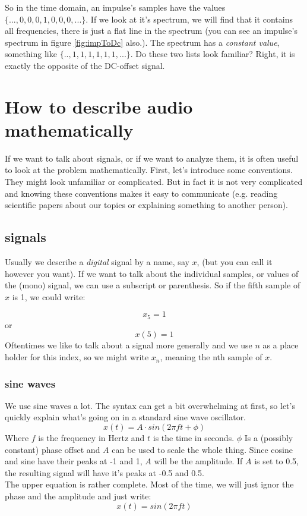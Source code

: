 So in the time domain, an impulse's samples have the values $\{...,0,0,0,1,0,0,0,...\}$. If we look at it's spectrum, we will find that it contains all frequencies, there is just a flat line in the spectrum (you can see an impulse's spectrum in figure \ref{fig:impToDc} also.). The spectrum has a \textit{constant value}, something like $\{..,1,1,1,1,1,1,...\}$. Do these two lists look familiar? Right, it is exactly the opposite of the DC-offset signal.



\section{How to describe audio mathematically}

If we want to talk about signals, or if we want to analyze them, it is often useful to look at the problem mathematically. First, let's introduce some conventions. They might look unfamiliar or complicated. But in fact it is not very complicated and knowing these conventions makes it easy to communicate (e.g. reading scientific papers about our topics or explaining something to another person).

\subsection{signals}

Usually we describe a \textit{digital} signal by a name, say $x$, (but you can call it however you want). If we want to talk about the individual samples, or values of the (mono) signal, we can use a subscript or parenthesis. So if the fifth sample of $x$ is 1, we could write:

\begin{equation}
	x_5=1
\end{equation}
or
\begin{equation}
	x(5)=1
\end{equation}
Oftentimes we like to talk about a signal more generally and we use $n$ as a place holder for this index, so we might write $x_n$, meaning the nth sample of $x$.

\subsubsection{sine waves}
We use sine waves a lot. The syntax can get a bit overwhelming at first, so let's quickly explain what's going on in a standard sine wave oscillator.
\begin{equation}
	x(t) = A \cdot sin(2\pi f t + \phi)
\end{equation}
Where $f$ is the frequency in Hertz and $t$ is the time in seconds. $\phi$ Is a (possibly constant) phase offset and $A$ can be used to scale the whole thing. Since cosine and sine have their peaks at -1 and 1, $A$ will be the amplitude. If $A$ is set to 0.5, the resulting signal will have it's peaks at -0.5 and 0.5. \\
The upper equation is rather complete. Most of the time, we will just ignor the phase and the amplitude and just write:
\begin{equation}
	x(t) = sin(2\pi f t )
\end{equation}

